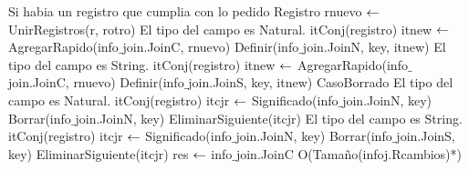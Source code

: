 {						\State Si habia un registro que cumplia con lo pedido
						\State	Registro rnuevo $\leftarrow$ UnirRegistros(r, rotro)
							\State	El tipo del campo es Natural.
							\State	itConj(registro) itnew $\leftarrow$ AgregarRapido(info$\_$join.JoinC, rnuevo)
							\State	Definir(info$\_$join.JoinN, key, itnew)
						\Else
							\State	El tipo del campo es String.
							\State	itConj(registro) itnew $\leftarrow$ AgregarRapido(info$\_$join.JoinC, rnuevo)
							\State	Definir(info$\_$join.JoinS, key, itnew)
						\EndIf
					\EndIf
				\Else	CasoBorrado
						\State	El tipo del campo es Natural.
						\State	itConj(registro) itcjr $\leftarrow$ Significado(info$\_$join.JoinN, key)
						\State	Borrar(info$\_$join.JoinN, key)
						\State	EliminarSiguiente(itcjr)
					\Else
						\State	El tipo del campo es String.
						\State	itConj(registro) itcjr $\leftarrow$ Significado(info$\_$join.JoinN, key)
						\State	Borrar(info$\_$join.JoinS, key)
						\State	EliminarSiguiente(itcjr)
					\EndIf
				\EndIf
		\EndWhile
	\EndIf
	\State res $\leftarrow$ info$\_$join.JoinC
}{O(Tamaño(infoj.Rcambios)*)}


